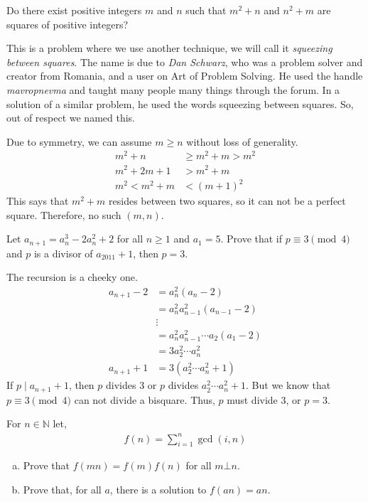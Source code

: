 \documentclass[problems.tex]{subfile}
\begin{document}
	\begin{problem}[Croatia $2014$]
		Do there exist positive integers $m$ and $n$ such that $m^2+n$ and $n^2+m$ are squares of positive integers?
	\end{problem}

This is a problem where we use another technique, we will call it \textit{squeezing between squares}. The name is due to \textit{Dan Schwarz}, who was a problem solver and creator from Romania, and a user on Art of Problem Solving. He used the handle \textit{mavropnevma} and taught many people many things through the forum. In a solution of a similar problem, he used the words squeezing between squares. So, out of respect we named this.
	\begin{solution}
		Due to symmetry, we can assume $m\geq n$ without loss of generality.
			\begin{align*}
				m^2+n & \geq m^2+m>m^2\\
				m^2+2m+1 &> m^2+m\\
				m^2 < m^2+m&<(m+1)^2
			\end{align*}
		This says that $m^2+m$ resides between two squares, so it can not be a perfect square. Therefore, no such $(m,n)$.
	\end{solution}

	\begin{problem}[Turkey $2011$]
		Let $a_{n+1}=a_n^3-2a_n^2+2$ for all $n\geq1$ and $a_1=5$. Prove that if $p\equiv3\pmod4$ and $p$ is a divisor of $a_{2011}+1$, then $p=3$.
	\end{problem}

	\begin{solution}
		The recursion is a cheeky one.
			\begin{align*}
				a_{n+1}-2 & = a_n^2(a_n-2)\\
						  & = a_n^2a_{n-1}^2(a_{n-1}-2)\\
						  & \vdots\\
						  & = a_n^2a_{n-1}^2\cdots a_2(a_1-2)\\
						  & = 3a_2^2\cdots a_n^2\\
				a_{n+1}+1 & = 3(a_2^2\cdots a_n^2+1)
			\end{align*}
		If $p\mid a_{n+1}+1$, then $p$ divides $3$ or $p$ divides $a_2^2\cdots a_n^2+1$. But we know that $p\equiv3\pmod4$ can not divide a bisquare. Thus, $p$ must divide $3$, or $p=3$.
	\end{solution}

	\begin{problem}
		For $n\in\mathbb{N} $ let,
			\begin{align*}
				f(n)=\sum\limits_{i=1}^n\gcd(i,n)
			\end{align*}

			\begin{enumerate}[(a)]
				\item Prove that $f(mn)=f(m)f(n)$ for all $m\bot n$.
				\item Prove that, for all $a$, there is a solution to $f(an)=an$.
			\end{enumerate}
	\end{problem}
\end{document}
